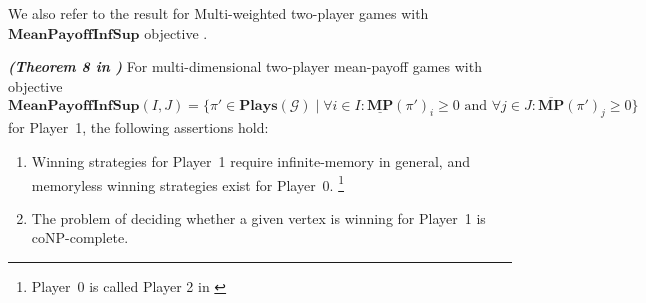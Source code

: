 \noindent We also refer to the result for Multi-weighted two-player games with $\mathbf{MeanPayoffInfSup}$ objective \cite{VCDHRR15}.

\begin{theorem}
    \label{ThmMemlessStrForP2}
    \textbf{\emph{(Theorem 8 in \cite{VCDHRR15})}} For multi-dimensional two-player mean-payoff games with objective \\
    $\mathbf{MeanPayoffInfSup}(I,J) = \{\pi' \in \mathbf{Plays}(\mathcal{G}) \mid \forall i \in I : \underline{\mathbf{MP}}(\pi')_i \geqslant 0 \text{ and } \forall j \in J : \overline{\mathbf{MP}}(\pi')_j \geqslant 0\}$ for Player~1, the following assertions hold:
    \begin{enumerate}
        \item Winning strategies for Player~1 require infinite-memory in general, and memoryless winning strategies exist for Player~0. \footnote{Player~0 is called Player 2 in \cite{FGR20}}
        \item The problem of deciding whether a given vertex is winning for Player~1 is coNP-complete.
    \end{enumerate}
\end{theorem}
 
